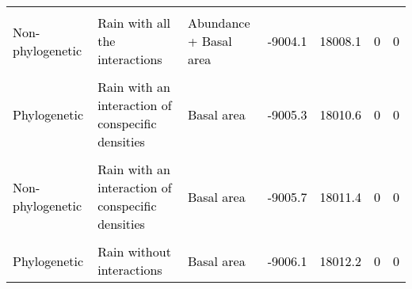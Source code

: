 \documentclass[
  12pt,
  letterpaper,
  DIV=11,
  numbers=noendperiod]{scrartcl}
\begin{document}
\begin{table}[H]
{\begin{tabular}[t]{lllllll}
\cellcolor{gray!6}{\textcolor{black}{Phylogenetic}} & \cellcolor{gray!6}{\textcolor{black}{Rain with all the interactions}} & \cellcolor{gray!6}{\textcolor{black}{Abundance + Basal area}} & \cellcolor{gray!6}{\textcolor{black}{-9004.0}} & \cellcolor{gray!6}{\textcolor{black}{18008.1}} & \cellcolor{gray!6}{\textcolor{black}{0}} & \cellcolor{gray!6}{\textcolor{black}{0}}\\
\textcolor{black}{Non-phylogenetic} & \textcolor{black}{Rain with all the interactions} & \textcolor{black}{Abundance + Basal area} & \textcolor{black}{-9004.1} & \textcolor{black}{18008.1} & \textcolor{black}{0} & \textcolor{black}{0}\\
\cellcolor{gray!6}{\textcolor{black}{Non-phylogenetic}} & \cellcolor{gray!6}{\textcolor{black}{Rain without interactions}} & \cellcolor{gray!6}{\textcolor{black}{Abundance}} & \cellcolor{gray!6}{\textcolor{black}{-9005.1}} & \cellcolor{gray!6}{\textcolor{black}{18010.3}} & \cellcolor{gray!6}{\textcolor{black}{0}} & \cellcolor{gray!6}{\textcolor{black}{0}}\\
\textcolor{black}{Phylogenetic} & \textcolor{black}{Rain with an interaction of conspecific densities} & \textcolor{black}{Basal area} & \textcolor{black}{-9005.3} & \textcolor{black}{18010.6} & \textcolor{black}{0} & \textcolor{black}{0}\\
\addlinespace
\cellcolor{gray!6}{\textcolor{black}{Non-phylogenetic}} & \cellcolor{gray!6}{\textcolor{black}{Rain with an interaction of conspecific densities}} & \cellcolor{gray!6}{\textcolor{black}{Abundance + Basal area}} & \cellcolor{gray!6}{\textcolor{black}{-9005.4}} & \cellcolor{gray!6}{\textcolor{black}{18010.9}} & \cellcolor{gray!6}{\textcolor{black}{0}} & \cellcolor{gray!6}{\textcolor{black}{0}}\\
\textcolor{black}{Non-phylogenetic} & \textcolor{black}{Rain with an interaction of conspecific densities} & \textcolor{black}{Basal area} & \textcolor{black}{-9005.7} & \textcolor{black}{18011.4} & \textcolor{black}{0} & \textcolor{black}{0}\\
\cellcolor{gray!6}{\textcolor{black}{Phylogenetic}} & \cellcolor{gray!6}{\textcolor{black}{Rain without interactions}} & \cellcolor{gray!6}{\textcolor{black}{Abundance}} & \cellcolor{gray!6}{\textcolor{black}{-9005.7}} & \cellcolor{gray!6}{\textcolor{black}{18011.4}} & \cellcolor{gray!6}{\textcolor{black}{0}} & \cellcolor{gray!6}{\textcolor{black}{0}}\\
\textcolor{black}{Phylogenetic} & \textcolor{black}{Rain without interactions} & \textcolor{black}{Basal area} & \textcolor{black}{-9006.1} & \textcolor{black}{18012.2} & \textcolor{black}{0} & \textcolor{black}{0}\\

\end{tabular}}
\end{table}
\end{document}
